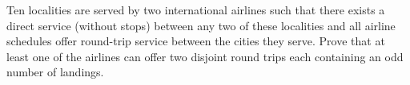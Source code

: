 Ten localities are served by two international airlines such that there exists a direct service (without stops) between any two of these localities and all airline schedules offer round-trip service between the cities they serve. Prove that at least one of the airlines can offer two disjoint round trips each containing an odd number of landings.
